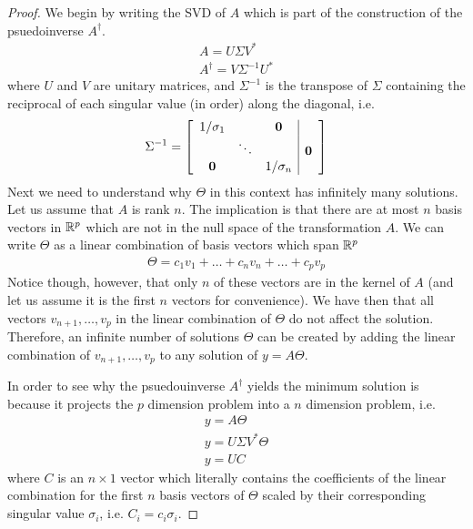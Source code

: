 \documentclass{article}
\begin{document}
\begin{proof}
    We begin by writing the SVD of $A$ which is part of the construction of the
    psuedoinverse $A^{\dagger}$. 
    \begin{gather*}
        A = U\Sigma V^*\\
        A^{\dagger} = V\Sigma^{-1}U^*
    \end{gather*}
    where $U$ and $V$ are unitary matrices, and $\Sigma^{-1}$ is the transpose of $\Sigma$ containing the reciprocal
    of each singular value (in order) along the diagonal, i.e. 
    \begin{gather*}
        \Sigma^{-1} = \left[\begin{array}{c c c | c}
                            1/\sigma_1 & & \boldsymbol{0} & \\
                             &\ddots & & \boldsymbol{0}\\
                            \boldsymbol{0} & & 1/\sigma_n &
                            \end{array}\right]
    \end{gather*}
    Next we need to understand why $\Theta$ in this context has infinitely many
    solutions. Let us assume that $A$ is rank $n$. The implication is that there
    are at most $n$ basis vectors in $\mathbb{R}^{p}$ which are not in the null space of
    the transformation $A$. We can write $\Theta$ as a linear combination
    of basis vectors which span $\mathbb{R}^{p}$
    \begin{gather*}
        \Theta = c_1v_1 + \ldots + c_nv_n + \ldots + c_pv_p
    \end{gather*}
    Notice though, however, that only $n$ of these vectors are in the kernel of
    $A$ (and let us assume it is the first $n$ vectors for convenience). We have
    then that all vectors $v_{n+1}, \ldots, v_{p}$ in the linear combination of
    $\Theta$ do not affect the solution. Therefore, an infinite number of
    solutions $\Theta$ can be created by adding the linear combination of
    $v_{n+1}, \ldots, v_p$ to any solution of $y = A\Theta$. 


    In order to see why the psuedouinverse $A^{\dagger}$ yields the minimum
    solution is because it projects the $p$ dimension problem into a $n$
    dimension problem, i.e.
    \begin{gather*}
        y = A\Theta \\
        y = U\Sigma V^*\Theta\\
        y = UC
    \end{gather*}
    where $C$ is an $n\times1$ vector which literally contains the coefficients
    of the linear combination for the first $n$ basis vectors of $\Theta$ scaled
    by their corresponding singular value $\sigma_i$, i.e. $C_i = c_i\sigma_i$. 


\end{proof}
\end{document}
